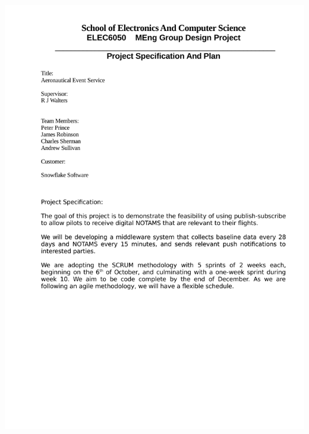 \documentclass[a4paper, 12pt, twoside]{article}
\begin{document}
\begin{center}
\includegraphics[scale=0.7]{spec.pdf}
\end{center}
\end{document}
